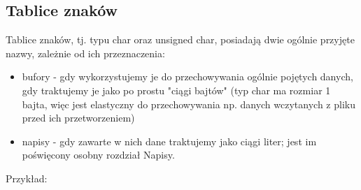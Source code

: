 \documentclass[a4paper,12pt]{article}
\begin{document}
\subsection*{Tablice znaków}
Tablice znaków, tj. typu char oraz unsigned char, posiadają dwie ogólnie przyjęte nazwy, zależnie od ich przeznaczenia:
\begin{itemize}
\item{bufory - gdy wykorzystujemy je do przechowywania ogólnie pojętych danych, gdy traktujemy je jako po prostu "ciągi bajtów" (typ char ma rozmiar 1 bajta, więc jest elastyczny do przechowywania np. danych wczytanych z pliku przed ich przetworzeniem)}
\item{napisy - gdy zawarte w nich dane traktujemy jako ciągi liter; jest im poświęcony osobny rozdział Napisy.}
\end{itemize}
\newpage
Przykład:
\end{document}
